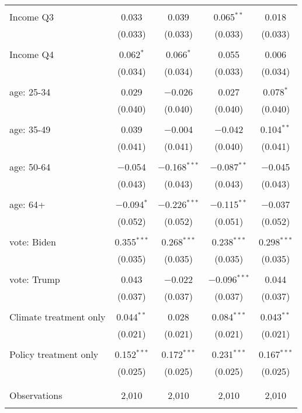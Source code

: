 \begin{tabular}{@{\extracolsep{5pt}}lcccc}
  & & & & \\ 
 Income Q3 & 0.033 & 0.039 & 0.065$^{**}$ & 0.018 \\ 
  & (0.033) & (0.033) & (0.033) & (0.033) \\ 
  & & & & \\ 
 Income Q4 & 0.062$^{*}$ & 0.066$^{*}$ & 0.055 & 0.006 \\ 
  & (0.034) & (0.034) & (0.033) & (0.034) \\ 
  & & & & \\ 
 age: 25-34 & 0.029 & $-$0.026 & 0.027 & 0.078$^{*}$ \\ 
  & (0.040) & (0.040) & (0.040) & (0.040) \\ 
  & & & & \\ 
 age: 35-49 & 0.039 & $-$0.004 & $-$0.042 & 0.104$^{**}$ \\ 
  & (0.041) & (0.041) & (0.040) & (0.041) \\ 
  & & & & \\ 
 age: 50-64 & $-$0.054 & $-$0.168$^{***}$ & $-$0.087$^{**}$ & $-$0.045 \\ 
  & (0.043) & (0.043) & (0.043) & (0.043) \\ 
  & & & & \\ 
 age: 64+ & $-$0.094$^{*}$ & $-$0.226$^{***}$ & $-$0.115$^{**}$ & $-$0.037 \\ 
  & (0.052) & (0.052) & (0.051) & (0.052) \\ 
  & & & & \\ 
 vote: Biden & 0.355$^{***}$ & 0.268$^{***}$ & 0.238$^{***}$ & 0.298$^{***}$ \\ 
  & (0.035) & (0.035) & (0.035) & (0.035) \\ 
  & & & & \\ 
 vote: Trump & 0.043 & $-$0.022 & $-$0.096$^{***}$ & 0.044 \\ 
  & (0.037) & (0.037) & (0.037) & (0.037) \\ 
  & & & & \\ 
 Climate treatment only & 0.044$^{**}$ & 0.028 & 0.084$^{***}$ & 0.043$^{**}$ \\ 
  & (0.021) & (0.021) & (0.021) & (0.021) \\ 
  & & & & \\ 
 Policy treatment only & 0.152$^{***}$ & 0.172$^{***}$ & 0.231$^{***}$ & 0.167$^{***}$ \\ 
  & (0.025) & (0.025) & (0.025) & (0.025) \\ 
  & & & & \\ 
\hline \\[-1.8ex] 

Observations & 2,010 & 2,010 & 2,010 & 2,010 \\ 
\hline 
\hline \\[-1.8ex] 
\end{tabular} 